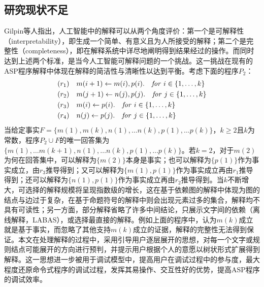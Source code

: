\subsection{研究现状不足}
Gilpin等人指出，人工智能中的解释可以从两个角度评价：第一个是可解释性（interpretability），即生成一个简单、有意义且为人所接受的解释；第二个是完整性（completeness），即在解释系统中详尽地阐明得到结果经过的操作。而同时达到上述两个标准，是当今人工智能可解释问题的一个挑战\cite{gilpin2018explaining}。这一挑战在现有的ASP程序解释中体现在解释的简洁性与清晰性以达到平衡。考虑下面的程序$P_2$：
\begin{align}
    &(r_1)\quad m(i+1) \leftarrow m(i), p(i).\ \ \  \mathit{for}\ i \in \{1, \ldots, k\} \notag\\ 
    &(r_2)\quad m(j+1) \leftarrow n(j), p(j).\ \ \  \mathit{for}\ j \in \{1, \ldots, k\} \notag\\
    &(r_3)\quad m(i) \leftarrow p(i).\ \ \  \mathit{for}\ i \in \{1, \ldots, k\}  \notag\\
    &(r_4)\quad n(j) \leftarrow p(j).\ \ \  \mathit{for}\ j \in \{1, \ldots, k\} \notag
  \end{align}
当给定事实$F=\{m(1), m(k), n(1), \ldots n(k),p(1), \ldots p(k)\}$，$k \ge 2$且$k$为常数，程序$P_2 \cup F$的唯一回答集为$\{m(1), \ldots m(k+1), n(1), \ldots n(k), p(1), \ldots p(k)\}$。若$k=2$，对于$m(2)$为何在回答集中，可以解释为$\{m(2)\}$本身是事实；也可以解释为$\{p(1)\}$作为事实成立，由$r_3$推导得到；又可以解释为$\{m(1),p(1)\}$作为事实成立再由$r_1$推导得到；还可以解释为$\{n(1),p(1)\}$作为事实成立再由$r_2$推导得到。当$k$不断增大，可选择的解释规模将呈现指数级的增长，这在基于依赖图的解释中体现为图的结点与边过于复杂，在基于命题符号的解释中则会出现元素过多的集合，解释均不具有可读性；另一方面，部分解释省略了许多中间结论，只展示文字间的依赖（离线解释，LABAS），或选择最直接的解释。例如上面的程序中，认为$m(k)$成立就是基于事实，而忽略了其他支持$m(k)$成立的证据，解释的完整性无法得到保证。本文在处理解释的过程中，采用引导用户逐层展开的思想，对每一个文字或规则结点可能展开的方向进行预判，并提示用户根据个人的意愿以树状形式扩展得到解释。这一思想进一步被用于调试模型中，提高用户在调试过程中的参与度，最大程度还原命令式程序的调试过程，发挥其易操作、交互性好的优势，提高ASP程序的调试效率。
